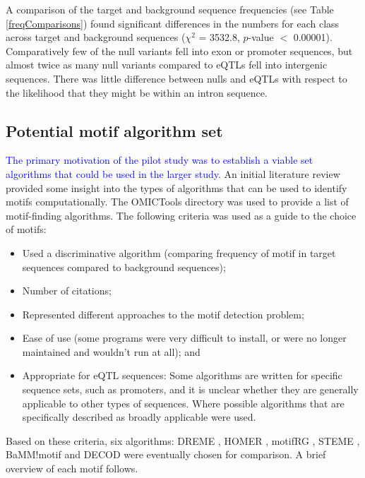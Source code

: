 \documentclass[12pt]{article}
\begin{document}
A comparison of the target and background sequence frequencies (see Table \ref{freqComparisons}) found significant differences in the numbers for each class across target and background sequences ($\chi^2$ = 3532.8, $p$-value $<$ 0.00001). Comparatively few of the null variants fell into exon or promoter sequences, but almost twice as many null variants compared to eQTLs fell into intergenic sequences. There was little difference between nulls and eQTLs with respect to the likelihood that they might be within an intron sequence.


 
\subsection{Potential motif algorithm set}

\textcolor{blue}{The primary motivation of the pilot study was to establish a viable set algorithms that could be used in the larger study}. An initial literature review provided some insight into the types of algorithms that can be used to identify motifs computationally. The OMICTools directory \citep{henry2014omictools} was used to provide a list of motif-finding algorithms. The following criteria was used as a guide to the choice of motifs:
\begin{itemize}
\item Used a discriminative algorithm (comparing frequency of motif in target sequences compared to background sequences);
\item Number of citations;
\item Represented different approaches to the motif detection problem;
\item Ease of use (some programs were very difficult to install, or were no longer maintained and wouldn't run at all); and
\item Appropriate for eQTL sequences: Some algorithms are written for specific sequence sets, such as promoters, and it is unclear whether they are generally applicable to other types of sequences. Where possible algorithms that are specifically described as broadly applicable were used.
\end{itemize}

Based on these criteria, six algorithms: DREME \citep{bailey2011dreme}, HOMER  \citep{heinz2010simple}, motifRG \citep{yao2014discriminative}, STEME \citep{reid2011steme}, BaMM!motif \citep{siebert2016bayesian} and DECOD \citep{huggins2011decod}  were eventually chosen for comparison. A brief overview of each motif follows.
\end{document}
